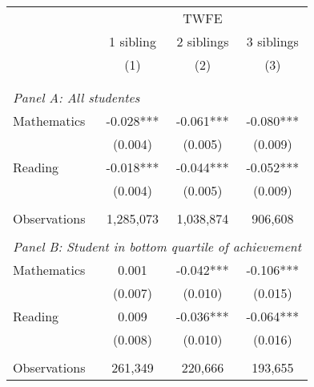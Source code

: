 \makeatletter
{}
{
\makeatother
\begin{tabular}{lccc}
\toprule
\cmidrule(lr){2-4}
& \multicolumn{3}{c}{TWFE} \\
\cmidrule(lr){2-4}
& 1 sibling & 2 siblings & 3 siblings  \\
\cmidrule(lr){2-2} \cmidrule(lr){3-3} \cmidrule(lr){4-4}
& (1) & (2) & (3)\\
\bottomrule
&  &  &  \\
&  &  &   \\
\multicolumn{4}{l}{\textit{Panel A: All studentes}} \\
\hspace{3mm}Mathematics&      -0.028***&      -0.061***&      -0.080***\\
                    &     (0.004)   &     (0.005)   &     (0.009)   \\
 
\hspace{3mm}Reading &      -0.018***&      -0.044***&      -0.052***\\
                    &     (0.004)   &     (0.005)   &     (0.009)   \\
                    &               &               &               \\
\hspace{3mm}Observations&   1,285,073   &   1,038,874   &     906,608   \\
 
&  &  &   \\
\multicolumn{4}{l}{\textit{Panel B: Student in bottom quartile of achievement}} \\
\hspace{3mm}Mathematics&       0.001   &      -0.042***&      -0.106***\\
                    &     (0.007)   &     (0.010)   &     (0.015)   \\
 
\hspace{3mm}Reading &       0.009   &      -0.036***&      -0.064***\\
                    &     (0.008)   &     (0.010)   &     (0.016)   \\
                    &               &               &               \\
\hspace{3mm}Observations&     261,349   &     220,666   &     193,655   \\
 

\end{tabular}}
